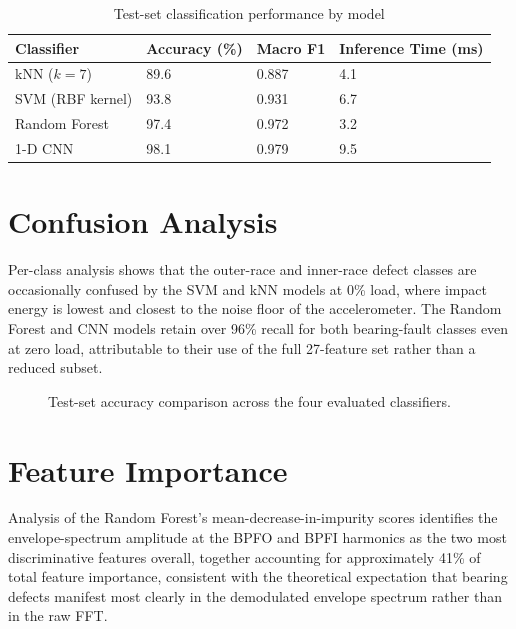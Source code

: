 \documentclass[12pt,a4paper]{report}
\begin{document}
\begin{table}[!ht]
\centering
\caption{Test-set classification performance by model}
\label{tab:results}
\begin{tabularx}{\textwidth}{@{}l X X X@{}}
\toprule
\textbf{Classifier} & \textbf{Accuracy (\%)} & \textbf{Macro F1} & \textbf{Inference Time (ms)} \\
\midrule
kNN ($k=7$)          & 89.6 & 0.887 & 4.1  \\
SVM (RBF kernel)      & 93.8 & 0.931 & 6.7  \\
\rowcolor{dtugray} Random Forest & 97.4 & 0.972 & 3.2  \\
1-D CNN               & 98.1 & 0.979 & 9.5  \\
\bottomrule
\end{tabularx}
\end{table}

\section{Confusion Analysis}
Per-class analysis shows that the outer-race and inner-race defect classes are occasionally
confused by the SVM and kNN models at 0\% load, where impact energy is lowest and closest to the
noise floor of the accelerometer. The Random Forest and CNN models retain over 96\% recall for
both bearing-fault classes even at zero load, attributable to their use of the full 27-feature
set rather than a reduced subset.

\begin{figure}[!ht]
\centering
{}
\caption{Test-set accuracy comparison across the four evaluated classifiers.}
\label{fig:barchart}
\end{figure}

\section{Feature Importance}
Analysis of the Random Forest's mean-decrease-in-impurity scores identifies the envelope-spectrum
amplitude at the BPFO and BPFI harmonics as the two most discriminative features overall,
together accounting for approximately 41\% of total feature importance, consistent with the
theoretical expectation that bearing defects manifest most clearly in the demodulated envelope
spectrum rather than in the raw FFT.
\end{document}
